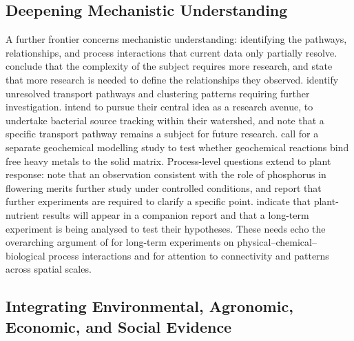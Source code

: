 \subsection{Deepening Mechanistic Understanding}

A further frontier concerns mechanistic understanding: identifying the pathways, relationships, and process interactions that current data only partially resolve. \textcite{Malone2014} conclude that the complexity of the subject requires more research, and \textcite{Cui2016} state that more research is needed to define the relationships they observed. \textcite{Petersen2012} identify unresolved transport pathways and clustering patterns requiring further investigation. \textcite{Tomer2008} intend to pursue their central idea as a research avenue, to undertake bacterial source tracking within their watershed, and note that a specific transport pathway remains a subject for future research. \textcite{Ali2013} call for a separate geochemical modelling study to test whether geochemical reactions bind free heavy metals to the solid matrix. Process-level questions extend to plant response: \textcite{GiménezValero2025} note that an observation consistent with the role of phosphorus in flowering merits further study under controlled conditions, and \textcite{Tamura2021} report that further experiments are required to clarify a specific point. \textcite{LAL1993} indicate that plant-nutrient results will appear in a companion report and that a long-term experiment is being analysed to test their hypotheses. These needs echo the overarching argument of \textcite{Rogger2017} for long-term experiments on physical--chemical--biological process interactions and for attention to connectivity and patterns across spatial scales.

\subsection{Integrating Environmental, Agronomic, Economic, and Social Evidence}

